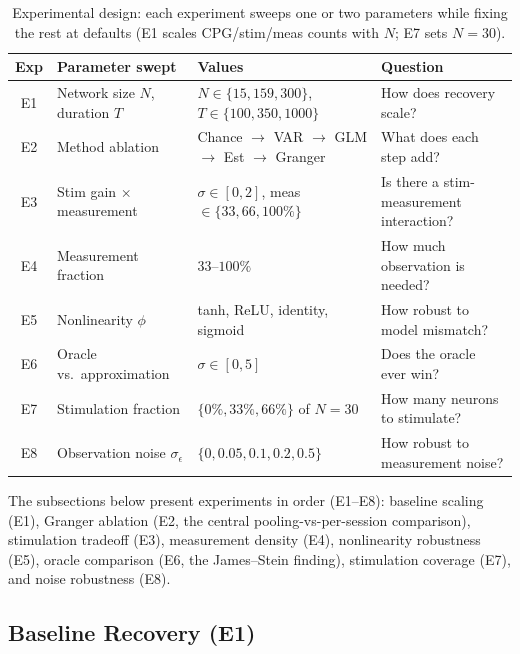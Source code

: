\documentclass{article}
\begin{document}
\begin{table}[ht]
\centering
\caption{Experimental design: each experiment sweeps one or two parameters while fixing the rest at defaults (E1 scales CPG/stim/meas counts with $N$; E7 sets $N{=}30$).}
\label{tab:design}
\small
\begin{tabular}{cp{3.2cm}p{4.5cm}p{3.8cm}}
\toprule
Exp & Parameter swept & Values & Question \\
\midrule
E1 & Network size $N$, duration $T$ & $N \in \{15,159,300\}$, $T \in \{100,350,1000\}$ & How does recovery scale? \\
E2 & Method ablation & Chance $\to$ VAR $\to$ GLM $\to$ Est $\to$ Granger & What does each step add? \\
E3 & Stim gain $\times$ measurement & $\sigma \in [0,2]$, meas $\in \{33,66,100\%\}$ & Is there a stim-measurement interaction? \\
E4 & Measurement fraction & $33$--$100\%$ & How much observation is needed? \\
E5 & Nonlinearity $\phi$ & tanh, ReLU, identity, sigmoid & How robust to model mismatch? \\
E6 & Oracle vs.\ approximation & $\sigma \in [0,5]$ & Does the oracle ever win? \\
E7 & Stimulation fraction & $\{0\%, 33\%, 66\%\}$ of $N{=}30$ & How many neurons to stimulate? \\
E8 & Observation noise $\sigma_\epsilon$ & $\{0, 0.05, 0.1, 0.2, 0.5\}$ & How robust to measurement noise? \\
\bottomrule
\end{tabular}
\end{table}

The subsections below present experiments in order (E1--E8): baseline scaling (E1), Granger ablation (E2, the central pooling-vs-per-session comparison), stimulation tradeoff (E3), measurement density (E4), nonlinearity robustness (E5), oracle comparison (E6, the James--Stein finding), stimulation coverage (E7), and noise robustness (E8).

\subsection{Baseline Recovery (E1)}
\end{document}
